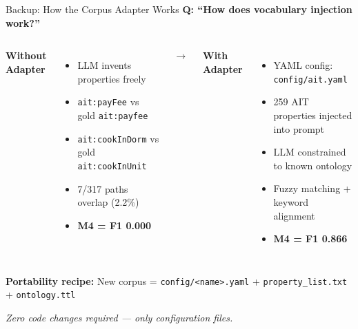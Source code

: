 \documentclass[aspectratio=169, 10pt]{beamer}
\begin{document}
\begin{frame}{Backup: How the Corpus Adapter Works}
    \textbf{Q: ``How does vocabulary injection work?''}

    \vspace{0.2cm}
    \begin{columns}
        \textbf{Without Adapter}
        \begin{itemize}
            \item LLM invents properties freely
            \item \texttt{ait:payFee} vs gold \texttt{ait:payfee}
            \item \texttt{ait:cookInDorm} vs gold \texttt{ait:cookInUnit}
            \item 7/317 paths overlap (2.2\%)
            \item \textbf{M4 = F1 0.000}
        \end{itemize}

        \centering \Huge$\rightarrow$

        \textbf{With Adapter}
        \begin{itemize}
            \item YAML config: \texttt{config/ait.yaml}
            \item 259 AIT properties injected into prompt
            \item LLM constrained to known ontology
            \item Fuzzy matching + keyword alignment
            \item \textbf{M4 = F1 0.866}
        \end{itemize}
    \end{columns}

    \vspace{0.4cm}
    \textbf{Portability recipe:} New corpus = \texttt{config/<name>.yaml} + \texttt{property\_list.txt} + \texttt{ontology.ttl}

    \vspace{0.1cm}
    \textit{Zero code changes required --- only configuration files.}
\end{frame}
\end{document}
